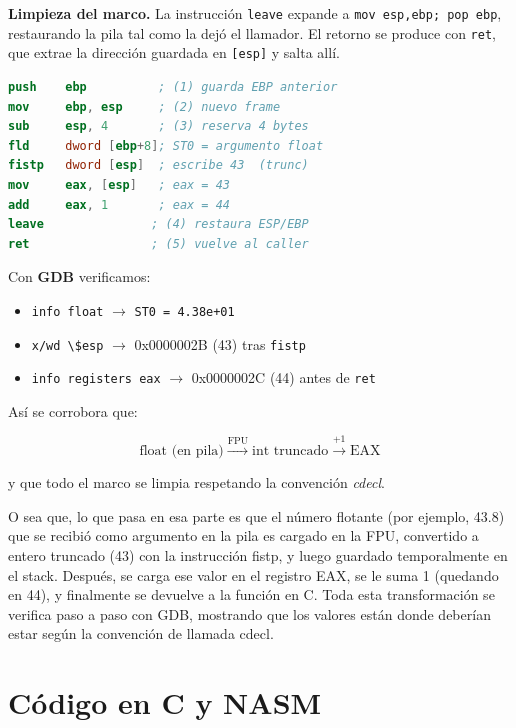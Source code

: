 \documentclass[a4paper,12pt]{article}
\begin{document}
\vspace{0.5em}
\noindent
\textbf{Limpieza del marco.} La instrucción
\lstinline{leave} expande a \lstinline{mov esp,ebp; pop ebp},
restaurando la pila tal como la dejó el llamador.
El retorno se produce con \lstinline{ret}, que
extrae la dirección guardada en \texttt{[esp]} y salta allí.

\begin{lstlisting}[language=NASM,caption={Fragmento clave de calculate_gini_int.asm}]
push    ebp          ; (1) guarda EBP anterior
mov     ebp, esp     ; (2) nuevo frame
sub     esp, 4       ; (3) reserva 4 bytes
fld     dword [ebp+8]; ST0 = argumento float
fistp   dword [esp]  ; escribe 43  (trunc)
mov     eax, [esp]   ; eax = 43
add     eax, 1       ; eax = 44
leave               ; (4) restaura ESP/EBP
ret                 ; (5) vuelve al caller
\end{lstlisting}

Con \textbf{GDB} verificamos:

\begin{itemize}
  \item \lstinline{info float} $\rightarrow$ \texttt{ST0 = 4.38e+01}
  \item \lstinline{x/wd \$esp} $\rightarrow$ 0x0000002B (43) tras \texttt{fistp}
  \item \lstinline{info registers eax} $\rightarrow$ 0x0000002C (44) antes de \texttt{ret}
\end{itemize}

Así se corrobora que:

\[
  \boxed{\text{float (en pila)} \xrightarrow{\text{FPU}} \text{int truncado} \xrightarrow{+1} \text{EAX}}
\]

y que todo el marco se limpia respetando la convención \emph{cdecl}.

O sea que, lo que pasa en esa parte es que el número flotante (por ejemplo, 43.8) que se recibió como argumento en la pila es cargado en la FPU, convertido a entero truncado (43) con la instrucción fistp, y luego guardado temporalmente en el stack. Después, se carga ese valor en el registro EAX, se le suma 1 (quedando en 44), y finalmente se devuelve a la función en C. Toda esta transformación se verifica paso a paso con GDB, mostrando que los valores están donde deberían estar según la convención de llamada cdecl.
\section{Código en C y NASM}
\end{document}
